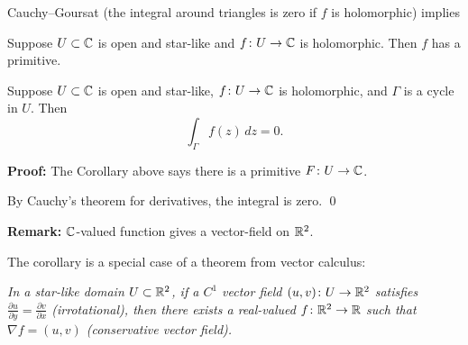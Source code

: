 \documentclass[10pt,aspectratio=169]{beamer}
\begin{document}
\begin{frame}

Cauchy--Goursat (the integral around
triangles is zero if $f$ is holomorphic) implies

\pause

\begin{corollary} \label{cor:primitiveinstarlike}
Suppose $U \subset {\mathbb{C}}$ is open and star-like
and $f \colon U \to {\mathbb{C}}$ is holomorphic.
Then $f$ has a primitive.
\end{corollary}

\pause

\begin{theorem}
Suppose $U \subset {\mathbb{C}}$ is open and star-like, $f \colon U \to {\mathbb{C}}$ is holomorphic,
and $\Gamma$ is
a cycle
in $U$.  Then
\begin{equation*}
\int_{\Gamma} f(z) \, dz = 0 .
\end{equation*}
\end{theorem}

\pause

\textbf{Proof:}
The Corollary above says there is a primitive
$F \colon U \to {\mathbb{C}}$.

\pause

By Cauchy's theorem for derivatives, the integral is zero. \qed

\pause

\medskip

\textbf{Remark:}
${\mathbb{C}}$-valued function gives a vector-field on ${\mathbb{R}}^2$.

The corollary is a special case of a theorem from vector calculus:

\medskip

\emph{In a star-like domain $U \subset {\mathbb{R}}^2$, if a
$C^1$ vector field $(u,v) \colon U \to {\mathbb{R}}^2$
satisfies $\frac{\partial u}{\partial y} = \frac{\partial v}{\partial x}$
(\emph{irrotational}),
then there exists a real-valued $f \colon {\mathbb{R}}^2 \to {\mathbb{R}}$ such that
$\nabla f = (u,v)$ (conservative vector field).}


\end{frame}
\end{document}
